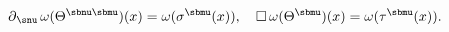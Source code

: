 \begin{equation} \label{6.2}
\partial{}_{\snu} \, \omega(\Theta^{\sbnu \sbmu})(x) 
= \omega(\sigma^{\sbmu}(x)), \quad
\square  \, \omega(\Theta^{\sbmu})(x)  = \omega(\tau^{\sbmu}(x)). 
\end{equation}

